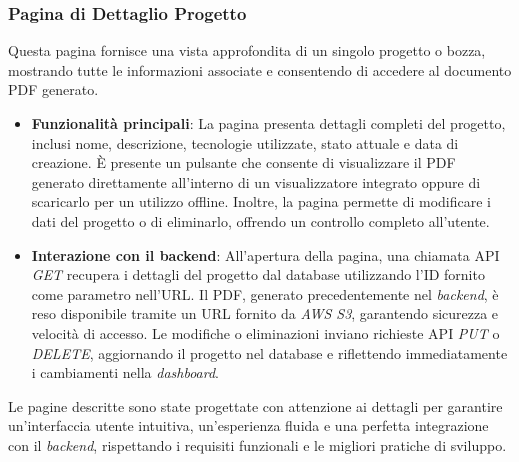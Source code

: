 \subsubsection{Pagina di Dettaglio Progetto}
Questa pagina fornisce una vista approfondita di un singolo progetto o bozza, mostrando tutte le informazioni associate e consentendo di accedere al documento PDF generato.
\begin{itemize}
    \item \textbf{Funzionalità principali}: La pagina presenta dettagli completi del progetto, inclusi nome, descrizione, tecnologie utilizzate, stato attuale e data di creazione. È presente un pulsante che consente di visualizzare il PDF generato direttamente all'interno di un visualizzatore integrato oppure di scaricarlo per un utilizzo offline. Inoltre, la pagina permette di modificare i dati del progetto o di eliminarlo, offrendo un controllo completo all'utente.
    \item \textbf{Interazione con il \gls{backend}}: All'apertura della pagina, una chiamata API \textit{GET} recupera i dettagli del progetto dal database utilizzando l'ID fornito come parametro nell'URL. Il PDF, generato precedentemente nel \textit{backend}, è reso disponibile tramite un URL fornito da \textit{AWS S3}, garantendo sicurezza e velocità di accesso. Le modifiche o eliminazioni inviano richieste API \textit{PUT} o \textit{DELETE}, aggiornando il progetto nel database e riflettendo immediatamente i cambiamenti nella \textit{dashboard}.
\end{itemize}

\noindent Le pagine descritte sono state progettate con attenzione ai dettagli per garantire un'interfaccia utente intuitiva, un'esperienza fluida e una perfetta integrazione con il \textit{backend}, rispettando i requisiti funzionali e le migliori pratiche di sviluppo.
